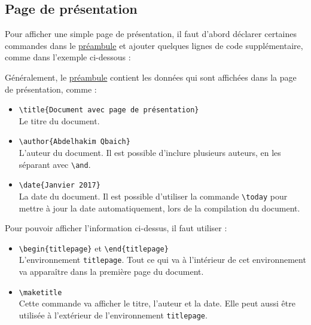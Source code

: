 \subsection{Page de présentation}

Pour afficher une simple page de présentation, il faut d'abord déclarer certaines commandes dans le \hyperref[preamble]{préambule} et ajouter quelques lignes de code supplémentaire, comme dans l'exemple ci-dessous :



Généralement, le \hyperref[preamble]{préambule} contient les données qui sont affichées dans la page de présentation, comme :

\begin{itemize}
  \item \lstinline|\title{Document avec page de présentation}|\\
  Le titre du document.

  \item \lstinline|\author{Abdelhakim Qbaich}|\\
  L'auteur du document.
  Il est possible d'inclure plusieurs auteurs, en les séparant avec \lstinline|\and|.

  \item \lstinline|\date{Janvier 2017}|\\
  La date du document.
  Il est possible d'utiliser la commande \lstinline|\today| pour mettre à jour la date automatiquement, lors de la compilation du document.
\end{itemize}

Pour pouvoir afficher l'information ci-dessus, il faut utiliser :

\begin{itemize}
  \item \lstinline|\begin{titlepage}| et \lstinline|\end{titlepage}|\\
  L'environnement \texttt{titlepage}.
  Tout ce qui va à l'intérieur de cet environnement va apparaître dans la première page du document.

  \item \lstinline|\maketitle|\\
  Cette commande va afficher le titre, l'auteur et la date.
  Elle peut aussi être utilisée à l'extérieur de l'environnement \texttt{titlepage}.
\end{itemize}

